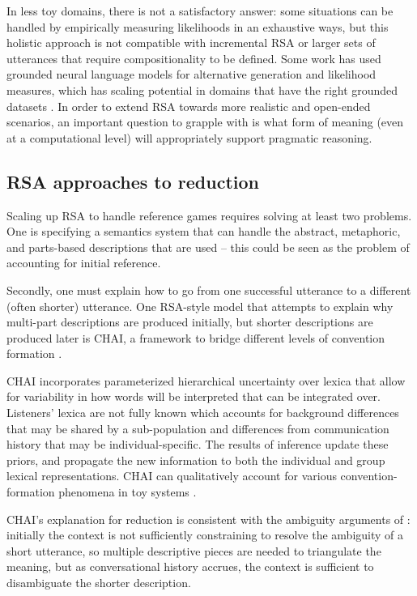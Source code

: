\documentclass[]{article}
\begin{document}
 In less toy domains, there is not a satisfactory answer: some situations can be handled by empirically measuring likelihoods in an exhaustive ways, but this holistic approach is not compatible with incremental RSA \citep{cohn-gordon2018a} or larger sets of utterances that require compositionality to be defined. Some work has used grounded neural language models for alternative generation and likelihood measures, which has scaling potential in domains that have the right grounded datasets \citep{monroe2015, white2020, cohn-gordon2018}.  In order to extend RSA towards more realistic and open-ended scenarios, an important question to grapple with is what form of meaning (even at a computational level) will appropriately support pragmatic reasoning. 
 
 

\subsection{RSA approaches to reduction}
Scaling up RSA to handle reference games requires solving at least two problems. One is specifying a semantics system that can handle the abstract, metaphoric, and parts-based descriptions that are used -- this could be seen as the problem of accounting for initial reference. 

Secondly, one must explain how to go from one successful utterance to a different (often shorter) utterance. One RSA-style model that attempts to explain why multi-part descriptions are produced initially, but shorter descriptions are produced later is CHAI,  a framework to bridge different levels of convention formation \citep{hawkins2021}.

CHAI incorporates parameterized hierarchical uncertainty over lexica that allow for variability in how words will be interpreted that can be integrated over. Listeners' lexica are not fully known which accounts for background differences that may be shared by a sub-population and differences from communication history that may be individual-specific. The results of inference update these priors, and propagate the new information to both the individual and group lexical representations. CHAI can qualitatively account for various convention-formation phenomena in toy systems \citep{hawkins2021}.

CHAI's explanation for reduction is consistent with the ambiguity arguments of \citet{piantadosi2012}: initially the context is not sufficiently constraining to resolve the ambiguity of a short utterance, so multiple descriptive pieces are needed to triangulate the meaning, but as conversational history accrues, the context is sufficient to disambiguate the shorter description. 
\end{document}
